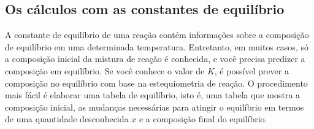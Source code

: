 \subsection{Os cálculos com as constantes de equilíbrio}

A constante de equilíbrio de uma reação contém informações sobre a composição de equilíbrio em uma determinada temperatura. Entretanto, em muitos
casos, só a composição inicial da mistura de reação é conhecida, e você precisa predizer a composição em equilíbrio. Se você conhece o valor de \(K\),
é possível prever a composição no equilíbrio com base na estequiometria de reação. O procedimento mais fácil é elaborar uma tabela de equilíbrio, isto
é, uma tabela que mostra a composição inicial, as mudanças necessárias para atingir o equilíbrio em termos de uma quantidade desconhecida \(x\) e a
composição final do equilíbrio.

